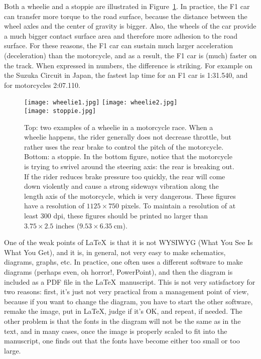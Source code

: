 \documentclass[12pt]{article}
\begin{document}
Both a wheelie and a stoppie are illustrated in Figure~\ref{fig::wheelie}. In practice, the F1 car can transfer more torque to the road surface, because the distance between the wheel axles and the center of gravity is bigger. Also, the wheels of the car provide a much bigger contact surface area and therefore more adhesion to the road surface. For these reasons, the F1 car can sustain much larger acceleration (deceleration) than the motorcycle, and as a result, the F1 car is (much) faster on the track. When expressed in numbers, the difference is striking. For example on the Suzuka Circuit in Japan, the fastest lap time for an F1 car is 1:31.540, and for motorcycles 2:07.110.

\begin{figure}
  \begin{center}
    \texttt{[image: wheelie1.jpg]}
    \texttt{[image: wheelie2.jpg]} \\
    \texttt{[image: stoppie.jpg]}
    \caption[]{Top: two examples of a wheelie in a motorcycle race. When a wheelie happens, the rider generally does not decrease throttle, but rather uses the rear brake to control the pitch of the motorcycle. Bottom: a stoppie. In the bottom figure, notice that the motorcycle is trying to swivel around the steering axis: the rear is breaking out. If the rider reduces brake pressure too quickly, the rear will come down violently and cause a strong sideways vibration along the length axis of the motorcycle, which is very dangerous. These figures have a resolution of $1125 \times 750$ pixels. To maintain a resolution of at least 300 dpi, these figures should be printed no larger than $3.75 \times 2.5$ inches ($9.53 \times 6.35~\si{\centi\meter}$).}\label{fig::wheelie}
  \end{center}
\end{figure}

One of the weak points of \LaTeX\ is that it is not WYSIWYG (What You See Is What You Get), and it is, in general, not very easy to make schematics, diagrams, graphs, etc. In practice, one often uses a different software to make diagrams (perhaps even, oh horror!, PowerPoint), and then the diagram is included as a PDF file in the \LaTeX\ manuscript. This is not very satisfactory for two reasons: first, it's just not very practical from a management point of view, because if you want to change the diagram, you have to start the other software, remake the image, put in \LaTeX, judge if it's OK, and repeat, if needed. The other problem is that the fonts in the diagram will not be the same as in the text, and in many cases, once the image is properly scaled to fit into the manuscript, one finds out that the fonts have become either too small or too large.
\end{document}
